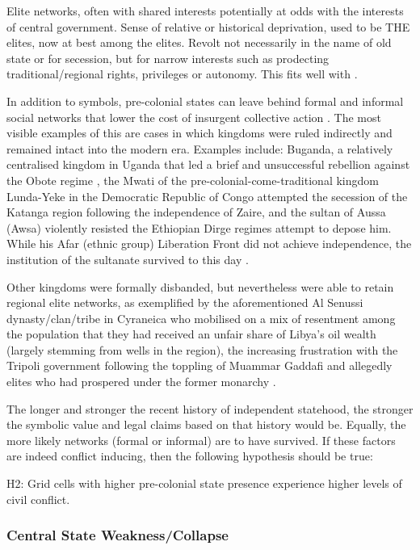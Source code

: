 \documentclass[12pt]{article}
\begin{document}
\begin{multicols}{2}
Elite networks, often with shared interests potentially at odds with the
interests of central government. Sense of relative or historical deprivation,
used to be THE elites, now at best among the elites. Revolt not necessarily in
the name of old state or for secession, but for narrow interests such as
prodecting traditional/regional rights, privileges or autonomy. This fits well
with \citet{Ying_2020}.

In addition to symbols, pre-colonial states can leave behind formal and informal
social networks that lower the cost of insurgent collective action
\citep{Wig2016, Wood2000}. The most visible examples of this are cases in which
kingdoms were ruled indirectly and remained intact into the modern era. Examples
include: Buganda, a relatively centralised kingdom in Uganda that led a brief
and unsuccessful rebellion against the Obote regime \citep{Tuck2005}, the Mwati
of the pre-colonial-come-traditional kingdom Lunda-Yeke in the Democratic
Republic of Congo attempted the secession of the Katanga region following the
independence of Zaire, and the sultan of Aussa (Awsa) violently resisted the
Ethiopian Dirge regimes attempt to depose him. While his Afar (ethnic group)
Liberation Front did not achieve independence, the institution of the sultanate
survived to this day \citep{Shehim1985, Hanfare2011}.

Other kingdoms were formally disbanded, but nevertheless were able to retain
regional elite networks, as exemplified by the aforementioned Al Senussi
dynasty/clan/tribe in Cyraneica who mobilised on a mix of resentment among the
population that they had received an unfair share of Libya's oil wealth (largely
stemming from wells in the region), the increasing frustration with the
Tripoli government following the toppling of Muammar Gaddafi and allegedly
elites who had prospered under the former monarchy \citep{Fetouri2012}.

The longer and stronger the recent history of independent statehood, the
stronger the symbolic value and legal claims based on that history would be.
Equally, the more likely networks (formal or informal) are to have survived. If
these factors are indeed conflict inducing, then the following hypothesis should
be true:

H2: Grid cells with higher pre-colonial state presence experience higher levels
of civil conflict. 

\subsubsection{Central State Weakness/Collapse} %


\end{multicols}
\end{document}
